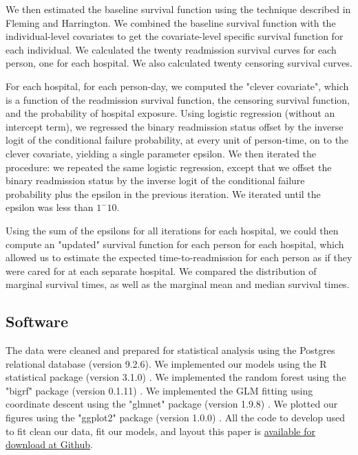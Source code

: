 \documentclass[]{article}\usepackage[]{graphicx}\usepackage[]{color}
\begin{document}
We then estimated the baseline survival function using the technique described in Fleming and Harrington. We combined the baseline survival function with the individual-level covariates to get the covariate-level specific survival function for each individual. We calculated the twenty readmission survival curves for each person, one for each hospital. We also calculated twenty censoring survival curves.

For each hospital, for each person-day, we computed the "clever covariate", which is a function of the readmission survival function, the censoring survival function, and the probability of hospital exposure. Using logistic regression (without an intercept term), we regressed the binary readmission status offset by the inverse logit of the conditional failure probability, at every unit of person-time, on to the clever covariate, yielding a single parameter epsilon. We then iterated the procedure: we repeated the same logistic regression, except that we offset the binary readmission status by the inverse logit of the conditional failure probability plus the epsilon in the previous iteration. We iterated until the epsilon was less than $1^-10$.

Using the sum of the epsilons for all iterations for each hospital, we could then compute an "updated" survival function for each person for each hospital, which allowed us to estimate the expected time-to-readmission for each person as if they were cared for at each separate hospital. We compared the distribution of marginal survival times, as well as the marginal mean and median survival times.

\subsection{Software}
The data were cleaned and prepared for statistical analysis using the Postgres relational database (version 9.2.6). We implemented our models using the R statistical package (version 3.1.0) \supercite{team_r:_2014}. We implemented the random forest using the "bigrf" package (version 0.1.11) \supercite{lim_bigrf:_2014}. We implemented the GLM fitting using coordinate descent using the "glmnet" package (version 1.9.8) \supercite{friedman_regularization_2010}. We plotted our figures using the "ggplot2" package (version 1.0.0) \supercite{wickham_ggplot2:_2009}. All the code to develop used to fit clean our data, fit our models, and layout this paper is \href{https://github.com/nograpes/tmle_readmissions}{available for download at Github}.
\end{document}
